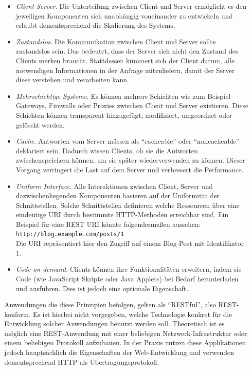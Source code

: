 \begin{itemize}
	\item \textit{Client-Server}. Die Unterteilung zwischen Client und Server ermöglicht es den jeweiligen Komponenten sich unabhängig voneinander zu entwickeln und erlaubt dementsprechend die Skalierung des Systems.
	\item \textit{Zustandslos}. Die Kommunikation zwischen Client und Server sollte zustandslos sein. Das bedeutet, dass der Server sich nicht den Zustand des Clients merken braucht. Stattdessen kümmert sich der Client darum, alle notwendigen Informationen in der Anfrage mitzuliefern, damit der Server diese verstehen und verarbeiten kann.
	\item \textit{Mehrschichtige Systeme}. Es können mehrere Schichten wie zum Beispiel Gateways, Firewalls oder Proxies zwischen Client und Server existieren. Diese Schichten können transparent hinzugefügt, modifiziert, umgeordnet oder gelöscht werden.
	\item \textit{Cache}. Antworten vom Server müssen als \enquote{cacheable} oder \enquote{noncacheable} deklariert sein. Dadurch wissen Clients, ob sie die Antworten zwischenspeichern können, um sie später wiederverwenden zu können. Dieser Vorgang verringert die Last auf dem Server und verbessert die Performance.
	\item \textit{Uniform Interface}. Alle Interaktionen zwischen Client, Server und dazwischenliegenden Komponenten basieren auf der Uniformität der Schnittstellen. Solche Schnittstellen definieren welche Ressourcen über eine eindeutige \acs{URI} durch bestimmte \acs{HTTP}-Methoden erreichbar sind. Ein Beispiel für eine REST URI könnte folgendermaßen aussehen: \\
	\texttt{http://blog.example.com/posts/1}\\
	Die URI repräsentiert hier den Zugriff auf einem Blog-Post mit Identifikator 1.
	\item \textit{Code on demand}. Clients können ihre Funktionalitäten erweitern, indem sie Code (wie JavaScript Skripte oder Java Applets) bei Bedarf herunterladen und ausführen. Dies ist jedoch eine optionale Eigenschaft.
\end{itemize}

Anwendungen die diese Prinzipien befolgen, gelten als \enquote{RESTful}, also REST-konform. Es ist hierbei nicht vorgegeben, welche Technologie konkret für die Entwicklung solcher Anwendungen benutzt werden soll.
Theoretisch ist es möglich eine REST-Anwendung mit einer beliebigen Netzwerk-Infrastruktur oder einem beliebigen Protokoll aufzubauen.
In der Praxis nutzen diese Applikationen jedoch hauptsächlich die Eigenschaften der Web-Entwicklung und verwenden dementsprechend \acs{HTTP} als Übertragungsprotokoll.

